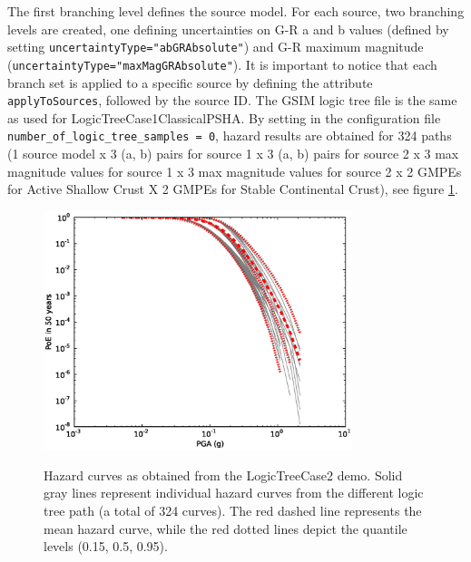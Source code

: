 The first branching level defines the source model. For each source, 
two branching levels are created, one defining
uncertainties on G-R a and b values (defined by setting 
\texttt{uncertaintyType="abGRAbsolute"}) and G-R maximum
magnitude (\texttt{uncertaintyType="maxMagGRAbsolute"}). 
%
It is important to notice that each branch set is applied
to a specific source by defining the attribute \texttt{apply\-To\-Sources}, 
followed by the source ID. The GSIM logic tree file is
the same as used for LogicTreeCase1ClassicalPSHA. By setting in the 
configuration file \texttt{number\_\-of\_\-logic\_\-tree\_\-samples = 0},
hazard results are obtained for 324 paths (1 source model x 3 (a, b) 
pairs for source 1 x  3 (a, b) pairs for source 2 x 3 max magnitude values
for source 1 x 3 max magnitude values for source 2 x 2 GMPEs for Active 
Shallow Crust X 2 GMPEs for Stable Continental Crust), see
figure \ref{fig:hazard_curves}.\\

\begin{figure} 
\centering 
\subcaptionbox{}
{\includegraphics[width=9cm]{./figures/hazard/hazard-curves-ltcase2.eps}} 
\caption{Hazard curves as obtained from the LogicTreeCase2 demo. Solid gray 
    lines represent individual hazard curves from the different
    logic tree path (a total of 324 curves). The red dashed line represents the
    mean hazard curve, while the red dotted lines depict the quantile levels
    (0.15, 0.5, 0.95).}
\label{fig:hazard_curves}
\end{figure}

